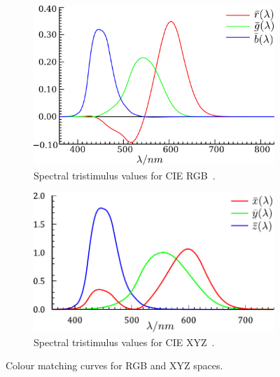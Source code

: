 \begin{figure}[htpb!]
        \centering
        \begin{subfigure}[b]{0.7\textwidth}
                \includegraphics[width=\textwidth]{img/CIE_RGB}
                \caption{Spectral tristimulus values for CIE RGB~\cite{CIE_RGB}.}
                \label{fig:cie_rgb}
        \end{subfigure}%
        \quad %
        \begin{subfigure}[b]{0.7\textwidth}
                \includegraphics[width=\textwidth]{img/CIE_XYZ}
                \caption{Spectral tristimulus values for CIE XYZ~\cite{CIE_XYZ}.}
                \label{fig:cie_xyz}
        \end{subfigure}
        \caption{Colour matching curves for RGB and XYZ spaces.}
\end{figure}

